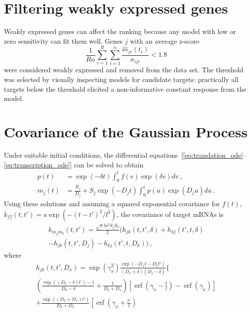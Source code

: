 \documentclass{pnastwo}
\newcommand{\erf}{\operatorname{erf}}
\begin{document}
\begin{article}
\begin{materials}
  \section{Filtering weakly expressed genes}
  Weakly expressed genes can affect the ranking because any model
  with low or zero sensitivity can fit them
  well. Genes $j$ with an average z-score 
  $$ \frac{1}{Rn} \sum_{r=1}^R \sum_{i=1}^n \frac{\hat{m}_{jr}(t_i)}{\sigma_{ijr}} < 1.8 $$
  were considered weakly expressed and removed from the data set.  The threshold
  was selected by visually inspecting models for candidate targets:
  practically all targets below the threshold elicited a
  non-informative constant response from the model.
  
  \section{Covariance of the Gaussian Process}
  Under suitable initial conditions, the differential
  equations~[\ref{eq:translation_ode}--\ref{eq:transcription_ode}]
  can be solved to obtain
  \begin{align*}
    p(t) &= \exp(-\delta t) \int_0^t f(v) \exp(\delta v) dv\ , \\
    m_j(t) &= \frac{B_j}{D_j} + S_j \exp(-D_j t) \int_0^t p(u)
    \exp(D_j u) du\ .
  \end{align*}
  Using these solutions and assuming a squared exponential covariance
  for $f(t)$, $k_{ff}(t, t') = a \exp( -(t-t')^2/l^2)$, the covariance of target mRNAs is
  \begin{multline*}
    k_{m_j m_k}(t, t')
    = \frac{\sqrt{\pi} l a^2 S_j S_k}{2} \bigg(
    h_{jk}(t, t', \delta) + h_{kj}(t', t, \delta) \\
    - h_{jk}(t, t', D_j) - h_{kj}(t', t, D_k)
    \bigg)\ ,
  \end{multline*}
  where
  \begin{multline*}
    h_{jk}(t, t', D_x) = 
    \exp\left(\gamma_x^2\right)
    \frac{\exp(-D_x t - D_k t')}{(D_x + \delta) (D_j - \delta)}
    \bigg\{ 
    \\
    \left(\frac{\exp((D_k-\delta) t') - 1}{D_k-\delta} +
      \frac{1}{D_k + D_x} \right)
    \left[\erf\left(\gamma_x - \frac{t}{l}\right) - \erf\left(\gamma_x\right)\right]
    \\
    + \frac{\exp((D_k+D_x)t')}{D_k+D_x}
    \left[\erf\left(\gamma_x + \frac{t'}{l}\right)

\end{multline*}
\end{materials}
\end{article}
\end{document}
